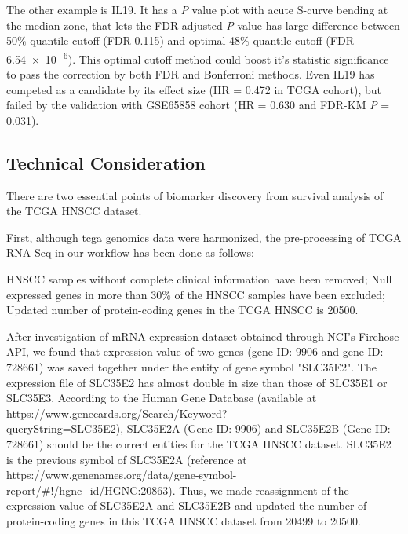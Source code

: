 \documentclass[jpm,article,submit,moreauthors,pdftex]{Definitions/mdpi}
\newenvironment{MyColorPar}[1]{%
    \leavevmode\color{#1}\ignorespaces%
}{%
}%
\begin{document}
\begin{paracol}{2}
\begin{MyColorPar}{red}
The other example is IL19. It has a \textit{P} value plot with acute S-curve bending at the median zone, that lets the FDR-adjusted \textit{P} value has large difference between 50\% quantile cutoff (FDR 0.115) and optimal 48\% quantile cutoff (FDR \num{6.54e-6}). This optimal cutoff method could boost it's statistic significance to pass the correction by both FDR and Bonferroni methods. Even IL19 has competed as a candidate by its effect size (HR = 0.472 in TCGA cohort), but failed by the validation with GSE65858 cohort (HR = 0.630 and FDR-KM \textit{P} = 0.031).

\end{MyColorPar} %



\subsection{Technical Consideration}
\begin{MyColorPar}{red} %
There are two essential points of biomarker discovery from survival analysis of the TCGA HNSCC dataset.

First, although \acrshort{tcga} genomics data were harmonized, 
the pre-processing of TCGA RNA-Seq in our workflow has been done as follows: 
\begin{outline}
\1 HNSCC samples without complete clinical information have been removed;
\1 Null expressed genes in more than 30\% of the HNSCC samples have been excluded; %
\1 Updated number of protein-coding genes in the TCGA HNSCC is 20500.
\end{outline}
After investigation of mRNA expression dataset obtained through NCI's Firehose API, we found that expression value of two genes (gene ID: 9906 and gene ID: 728661) was saved together under the entity of gene symbol "SLC35E2".
The expression file of SLC35E2 has almost double in size than those of SLC35E1 or SLC35E3.
According to the Human Gene Database (available at https://www.genecards.org/Search/Keyword?\\queryString=SLC35E2), SLC35E2A (Gene ID: 9906) and SLC35E2B (Gene ID: 728661) should be the correct entities for the TCGA HNSCC dataset.
SLC35E2 is the previous symbol of SLC35E2A (reference at https://www.genenames.org/data/gene-symbol-report/\#!/hgnc\_id/HGNC:20863).
Thus, we made reassignment of the expression value of SLC35E2A and SLC35E2B and updated the number of protein-coding genes in this TCGA HNSCC dataset from 20499 to 20500.


\end{MyColorPar}
\end{paracol}
\end{document}
